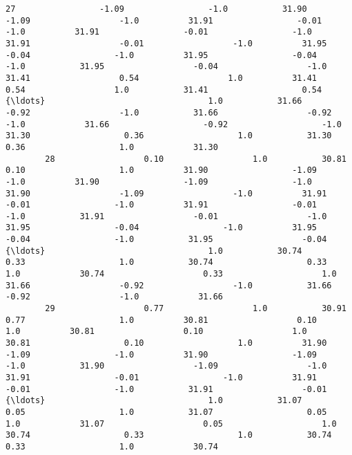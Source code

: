 \documentclass[11pt]{article}
\begin{document}
\begin{Verbatim}[commandchars=\\\{\}]
        27                 -1.09                 -1.0           31.90                  -1.09                  -1.0          31.91                 -0.01                 -1.0          31.91                 -0.01                 -1.0           31.91                  -0.01                  -1.0          31.95                 -0.04                 -1.0          31.95                 -0.04                 -1.0           31.95                  -0.04                  -1.0          31.41                  0.54                  1.0          31.41                  0.54                  1.0           31.41                   0.54              {\ldots}                                 1.0           31.66                  -0.92                  -1.0           31.66                  -0.92                  -1.0            31.66                   -0.92                   -1.0           31.30                   0.36                   1.0           31.30                   0.36                   1.0            31.30   
        28                  0.10                  1.0           30.81                   0.10                   1.0          31.90                 -1.09                 -1.0          31.90                 -1.09                 -1.0           31.90                  -1.09                  -1.0          31.91                 -0.01                 -1.0          31.91                 -0.01                 -1.0           31.91                  -0.01                  -1.0          31.95                 -0.04                 -1.0          31.95                 -0.04                 -1.0           31.95                  -0.04              {\ldots}                                 1.0           30.74                   0.33                   1.0           30.74                   0.33                   1.0            30.74                    0.33                    1.0           31.66                  -0.92                  -1.0           31.66                  -0.92                  -1.0            31.66   
        29                  0.77                  1.0           30.91                   0.77                   1.0          30.81                  0.10                  1.0          30.81                  0.10                  1.0           30.81                   0.10                   1.0          31.90                 -1.09                 -1.0          31.90                 -1.09                 -1.0           31.90                  -1.09                  -1.0          31.91                 -0.01                 -1.0          31.91                 -0.01                 -1.0           31.91                  -0.01              {\ldots}                                 1.0           31.07                   0.05                   1.0           31.07                   0.05                   1.0            31.07                    0.05                    1.0           30.74                   0.33                   1.0           30.74                   0.33                   1.0            30.74   

\end{Verbatim}
\end{document}
